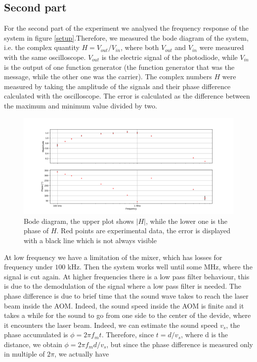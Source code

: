 \documentclass[a4paper,10pt]{article}
\begin{document}
\subsection{Second part}
For the second part of the experiment we analysed the frequency response of the system in figure \ref{setup}.Therefore, we measured the bode diagram of the system, i.e. the complex quantity $H = V_{out}/V_{in}$, where both $V_{out}$ and $V_{in}$ were measured with the same oscilloscope. $V_{out}$ is the electric signal of the photodiode, while $V_{in}$ is the output of one function generator (the function generator that was the message, while the other one was the carrier). The complex numbers $H$ were measured by taking the amplitude of the signals and their phase difference calculated with the oscilloscope. The error is calculated as the difference between the maximum and minimum value divided by two.
\begin{figure}[H]
\centering
\includegraphics[width=\textwidth]{bode}
\caption{Bode diagram, the upper plot shows $|H|$, while the lower one is the phase of $H$. Red points are experimental data, the error is displayed with a black line which is not always visible}\label{bode}
\end{figure}
At low frequency we have a limitation of the mixer, which has losses for frequency under $100$ kHz. Then the system works well until some MHz, where the signal is cut again. At higher frequencies there is a low pass filter behaviour, this is due to the demodulation of the signal where a low pass filter is needed.
The phase difference is due to brief time that the sound wave takes to reach the laser beam inside the AOM. Indeed, the sound speed inside the AOM is finite and it takes a while for the sound to go from one side to the center of the devide, where it encounters the laser beam. Indeed, we can estimate the sound speed $v_s$, the phase accumulated is $\phi = 2\pi f_m t$. Therefore, since $t = d/v_s$, where d is the distance, we obtain $\phi = 2\pi f_m d/v_s$, but since the phase difference is measured only in multiple of $2\pi$, we actually have
\end{document}
